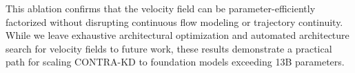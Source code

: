 \documentclass{article} %
\theoremstyle{definition}
\theoremstyle{remark}
\begin{document}
This ablation confirms that the velocity field can be parameter-efficiently factorized without disrupting continuous flow modeling or trajectory continuity. While we leave exhaustive architectural optimization and automated architecture search for velocity fields to future work, these results demonstrate a practical path for scaling CONTRA-KD to foundation models exceeding 13B parameters.

\end{document}
